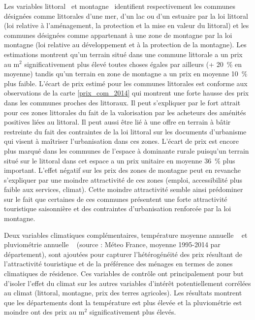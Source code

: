 \documentclass[10.5pt,a4paper]{article}
\begin{document}
{Les variables \og littoral \fg~et \og montagne \fg~identifient respectivement les communes désignées comme littorales  d'une mer, d'un lac ou d'un estuaire par la loi littoral (loi relative à l'aménagement, la protection et la mise en valeur du littoral) et les communes désignées comme appartenant à une zone de montagne par la loi montagne (loi relative au développement et à la protection de la montagne).  Les estimations montrent qu'un terrain situé dans une commune littorale a un prix au m$^2$ significativement plus élevé toutes choses égales par ailleurs (+ 20~\% en moyenne) tandis qu'un terrain en zone de montagne a un prix en moyenne 10~\% plus faible. L'écart de prix estimé pour les communes littorales est conforme aux observations de la carte \ref{prix_com_2014} qui montrent une forte hausse des prix dans les communes proches des littoraux. Il peut s'expliquer par le fort attrait pour ces zones littorales du fait de la valorisation par les acheteurs des aménités positives liées au littoral. Il peut aussi être lié à une offre en terrain à bâtir restreinte du fait des contraintes de la loi littoral sur les documents d'urbanisme qui visent à maîtriser l'urbanisation dans ces zones. L'écart de prix est encore plus marqué dans les communes de l'espace à dominante rurale puisqu'un terrain situé sur le littoral dans cet espace a un prix unitaire en moyenne 36~\% plus important. L'effet négatif sur les prix des zones de montagne peut en revanche s'expliquer par une moindre attractivité de ces zones (emploi, accessibilité plus faible aux services, climat). Cette moindre attractivité semble ainsi prédominer sur le fait que certaines de ces communes présentent une forte attractivité touristique saisonnière et des contraintes d'urbanisation renforcée par la loi montagne.\par   

Deux variables climatiques complémentaires, \og température moyenne annuelle \fg~ et \og pluviométrie annuelle \fg~ (source : Méteo France, moyenne 1995-2014 par département), sont ajoutées pour capturer l'hétérogénéité des prix résultant de l'attractivité touristique et de la préférence des ménages en termes de zones climatiques de résidence. Ces variables de contrôle ont principalement pour but d'isoler l'effet du climat sur les autres variables d'intérêt potentiellement corrélées au climat (littoral, montagne, prix des terres agricoles). Les résultats montrent que les départements dont la température est plus élevée et la pluviométrie est moindre ont des prix au m$^2$ significativement plus élevés. \par  

}
\end{document}
